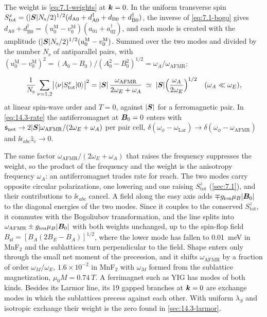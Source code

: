 The weight is \cref{eq:7.1-weights} at $\bm{k} = 0$. In the uniform transverse spin $S^x_{\mathrm{tot}} = (|\bm{S}|N_{\mathrm{s}}/2)^{1/2}(d_{\mathrm{A}0} + d^\dagger_{\mathrm{A}0} + d_{\mathrm{B}0} + d^\dagger_{\mathrm{B}0})$, the inverse of \cref{eq:7.1-bogo} gives $d_{\mathrm{A}0} + d^\dagger_{\mathrm{B}0} = (u^{\mathrm{M}}_0 - v^{\mathrm{M}}_0)(a_{01} + a^\dagger_{02})$, and each mode is created with the amplitude $(|\bm{S}|N_{\mathrm{s}}/2)^{1/2}(u^{\mathrm{M}}_0 - v^{\mathrm{M}}_0)$. Summed over the two modes and divided by the number $N_{\mathrm{s}}$ of antiparallel pairs, with $(u^{\mathrm{M}}_0 - v^{\mathrm{M}}_0)^2 = (A_0 - B_0)/(A_0^2 - B_0^2)^{1/2} = \omega_A/\omega_{\mathrm{AFMR}}$:
\begin{keyresult}
\begin{equation}
  \frac{1}{N_{\mathrm{s}}}\sum_{\nu=1,2}\bigl|\langle\nu|S^x_{\mathrm{tot}}|0\rangle\bigr|^2 = |\bm{S}|\,\frac{\omega_{\mathrm{AFMR}}}{2\omega_E + \omega_A} \;\simeq\; |\bm{S}|\Bigl(\frac{\omega_A}{2\omega_E}\Bigr)^{1/2} \quad (\omega_A \ll \omega_E),
  \label{eq:14.3-afmrweight}
\end{equation}
at linear spin-wave order and $T = 0$, against $|\bm{S}|$ for a ferromagnetic pair. In \cref{eq:14.3-rate} the antiferromagnet at $\bm{B}_0 = 0$ enters with $\mathfrak{s}_{\mathrm{net}} \to 2|\bm{S}|\omega_{\mathrm{AFMR}}/(2\omega_E + \omega_A)$ per pair cell, $\delta(\omega_\phi - \omega_{\mathrm{Lar}}) \to \delta(\omega_\phi - \omega_{\mathrm{AFMR}})$ and $\ii\epsilon_{abc}\hat z_c \to 0$.
\end{keyresult}
The same factor $\omega_{\mathrm{AFMR}}/(2\omega_E + \omega_A)$ that raises the frequency suppresses the weight, so the product of the frequency and the weight is the anisotropy frequency $\omega_A$: an antiferromagnet trades rate for reach. The two modes carry opposite circular polarizations, one lowering and one raising $S^z_{\mathrm{tot}}$ (\cref{sec:7.1}), and their contributions to $\ii\epsilon_{abc}$ cancel. A field along the easy axis adds $\mp g_{\mathrm{ion}}\mu_B|\bm{B}_0|$ to the diagonal energies of the two modes. Since it couples to the conserved $S^z_{\mathrm{tot}}$, it commutes with the Bogoliubov transformation, and the line splits into $\omega_{\mathrm{AFMR}} \pm g_{\mathrm{ion}}\mu_B|\bm{B}_0|$ with both weights unchanged, up to the spin-flop field $B_{\mathrm{sf}} = [B_A(2B_E - B_A)]^{1/2}$, where the lower mode has fallen to \SI{0.01}{meV} in MnF$_2$ and the sublattices turn perpendicular to the field. Shape enters only through the small net moment of the precession, and it shifts $\omega_{\mathrm{AFMR}}$ by a fraction of order $\omega_M/\omega_E$, $1.6\times10^{-2}$ in MnF$_2$ with $\omega_M$ formed from the sublattice magnetization, $\mu_0M = \SI{0.74}{T}$. A ferrimagnet such as YIG has modes of both kinds. Besides its Larmor line, its 19 gapped branches at $\bm{k} = 0$ are exchange modes in which the sublattices precess against each other. With uniform $\lambda_S$ and isotropic exchange their weight is the zero found in \cref{sec:14.3-larmor}.


